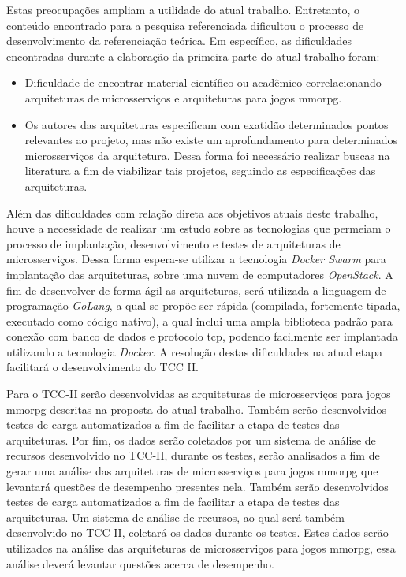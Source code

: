 Estas preocupações ampliam a utilidade do atual trabalho.
%
Entretanto, o conteúdo encontrado para a pesquisa referenciada dificultou o processo de desenvolvimento da referenciação teórica.
%
Em específico, as dificuldades encontradas durante a elaboração da primeira parte do atual trabalho foram:

\begin{itemize}
  \item Dificuldade de encontrar material científico ou acadêmico correlacionando arquiteturas de microsserviços e arquiteturas para jogos \ac{mmorpg}.
  \item Os autores das arquiteturas especificam com exatidão determinados pontos relevantes ao projeto, mas não existe um aprofundamento para determinados microsserviços da arquitetura. Dessa forma foi necessário realizar buscas na literatura a fim de viabilizar tais projetos, seguindo as especificações das arquiteturas.
\end{itemize}

Além das dificuldades com relação direta aos objetivos atuais deste trabalho, houve a necessidade de realizar um estudo sobre as tecnologias que permeiam o processo de implantação, desenvolvimento e testes de arquiteturas de microsserviços.
%
Dessa forma espera-se utilizar a tecnologia \textit{Docker Swarm} para implantação das arquiteturas, sobre uma nuvem de computadores \textit{OpenStack}.
%
A fim de desenvolver de forma ágil as arquiteturas, será utilizada a linguagem de programação \textit{GoLang}, a qual se propõe ser rápida (compilada, fortemente tipada, executado como código nativo), a qual inclui uma ampla biblioteca padrão para conexão com banco de dados e protocolo \ac{tcp}, podendo facilmente ser implantada utilizando a tecnologia \textit{Docker}.
%
A resolução destas dificuldades na atual etapa facilitará o desenvolvimento do TCC II.

Para o TCC-II serão desenvolvidas as arquiteturas de microsserviços para jogos \ac{mmorpg} descritas na proposta do atual trabalho.
%
Também serão desenvolvidos testes de carga automatizados a fim de facilitar a etapa de testes das arquiteturas.
%
Por fim, os dados serão coletados por um sistema de análise de recursos desenvolvido no TCC-II, durante os testes, serão analisados a fim de gerar uma análise das arquiteturas de microsserviços para jogos \ac{mmorpg} que levantará questões de desempenho presentes nela.
%
Também serão desenvolvidos testes de carga automatizados a fim de facilitar a etapa de testes das arquiteturas.
%
Um sistema de análise de recursos, ao qual será também desenvolvido no TCC-II, coletará os dados durante os testes. Estes dados serão utilizados na análise das arquiteturas de microsserviços para jogos \ac{mmorpg}, essa análise deverá levantar questões acerca de desempenho.


